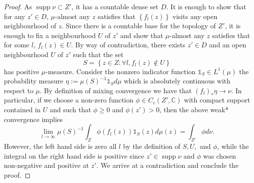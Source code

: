 \documentclass[reqno,11pt, twoside]{amsart}
\theoremstyle{plain}
\theoremstyle{definition}
\theoremstyle{definition}
\theoremstyle{remark}
\numberwithin{equation}{section}
\newcommand{\dist}{\operatorname{dist}}
\newcommand{\N}{{\mathbb{N}}}
\newcommand{\ignore}[1]{{}}
\newcommand{\bC}{\mathbb{C}}
\newcommand\seta[1]{\left\{#1\right\}}
\newcommand\on[1]{\operatorname{#1}}
\begin{document}
\begin{proof}
As $\on{supp} \nu\subset Z'$, it has a countable dense set $D$.
It is enough to show that for any $z'\in D$, $\mu$-almost any $z$ satisfies that $\seta{f_l(z)}$ visits any open neighbourhood of $z$. Since there is a countable base for the topology of $Z'$, it is enough to fix a neighbourhood 
$U$ of $z'$ and show that $\mu$-almost any $z$ satisfies that for some $l$, $f_l(z)\in U$. By way of contradiction, there exists $z'\in D$ and 
an open neighbourhood $U$ of $z'$ such that the set 
$$S = \seta{z\in Z:\forall l, f_l(z)\notin U}$$
has positive $\mu$-measure.
\ignore{


Thus, to prove the proposition it suffices to show that, for every $z'  \in \on{supp}\nu$, $i \in \N$ and $\varepsilon>0$, the $\mu$-measure of
\begin{equation*}
     S= \bigcap_{n > i} \left\lbrace z \in Z: \dist_{Z'}(f_n(z), z') > \varepsilon\right\rbrace
\end{equation*}
is zero.
}
Consider the nonzero indicator function $\mathds{1}_S \in L^1(\mu)$ the probability measure $\eta:= \mu(S)^{-1}\mathds{1}_S d\mu$ which is absolutely continuous with respect to $\mu$. By definition of mixing convergence we have that $(f_l)_*\eta\to \nu$. In particular, if we choose a non-zero function 
$\phi\in C_c(Z',\bC)$ with compact support contained in $U$ and such that $\phi\ge 0$ and $\phi(z')>0$, then the above weak* convergence implies
\begin{equation*}
    \lim_{l \to \infty} \mu(S)^{-1}\int_Z \phi(f_l(z)) \mathds{1}_S(z) d\mu (z) = \int_{Z'} \phi d\nu. 
\end{equation*}
However, the left hand side is zero all $l$ by the definition of $S, U,$ and $\phi$, while the integral on the right hand side is positive since $z' \in \on{supp} \nu$ and $\phi$ was chosen non-negative and positive at $z'$. We arrive at a contradiction and conclude the proof.
\end{proof}
\end{document}
